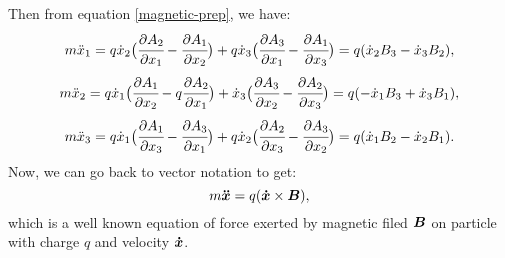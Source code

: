 \documentclass[main.tex]{subfiles}
\begin{document}
Then from equation \ref{magnetic-prep}, we have:
\begin{equation}
m \ddot{x}_1 = q\dot{x}_2 \big(\cfrac{\partial A_2}{\partial x_1} - \cfrac{\partial A_1}{\partial x_2}\big) + q\dot{x}_3 \big(\cfrac{\partial A_3}{\partial x_1} - \cfrac{\partial A_1}{\partial x_3}\big) = q(\dot{x}_2 B_3 - \dot{x}_3 B_2),
\end{equation}
\begin{equation}
m \ddot{x}_2 = q\dot{x}_1 \big(\cfrac{\partial A_1}{\partial x_2} - q\cfrac{\partial A_2}{\partial x_1}\big) + \dot{x}_3 \big(\cfrac{\partial A_3}{\partial x_2} - \cfrac{\partial A_2}{\partial x_3}\big) = q(-\dot{x}_1 B_3  + \dot{x}_3 B_1),
\end{equation}
\begin{equation}
m \ddot{x}_3 = q\dot{x}_1 \big(\cfrac{\partial A_1}{\partial x_3} - \cfrac{\partial A_3}{\partial x_1}\big) + q\dot{x}_2 \big(\cfrac{\partial A_2}{\partial x_3} - \cfrac{\partial A_3}{\partial x_2}\big) = q(\dot{x}_1 B_2 - \dot{x}_2 B_1).
\end{equation}
Now, we can go back to vector notation to get:
\begin{equation}
m\boldsymbol{\ddot{x}} = q(\boldsymbol{\dot{x}} \times \boldsymbol{B}),
\end{equation}
which is a well known equation of force exerted by magnetic filed $\boldsymbol{B}$ on particle with charge $q$ and velocity $\boldsymbol{\dot{x}}$.
\end{document}
